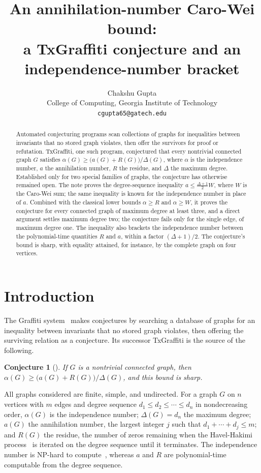 \documentclass[11pt]{article}
\title{An annihilation-number Caro-Wei bound:\\
       a TxGraffiti conjecture and an independence-number bracket}
\author{Chakshu Gupta\\[2pt]
  {\small College of Computing, Georgia Institute of Technology}\\
  {\small \texttt{cgupta65@gatech.edu}}}
\date{}
\newtheorem{conjecture}{Conjecture}
\theoremstyle{remark}
\newcommand{\degseq}{d_1 \le d_2 \le \cdots \le d_n}
\begin{document}
\maketitle

\begin{abstract}
Automated conjecturing programs scan collections of graphs for inequalities
between invariants that no stored graph violates, then offer the survivors for
proof or refutation. TxGraffiti, one such program, conjectured that every
nontrivial connected graph $G$ satisfies
$\alpha(G) \ge \bigl(a(G) + R(G)\bigr)/\Delta(G)$, where $\alpha$ is the
independence number, $a$ the annihilation number, $R$ the residue, and
$\Delta$ the maximum degree. Established only for two special families of
graphs, the conjecture has otherwise remained open. The note proves the
degree-sequence inequality $a \le \tfrac{\Delta+1}{2}W$, where $W$ is the
Caro-Wei sum; the same inequality is known for the independence number in
place of $a$. Combined with the classical lower bounds $\alpha \ge R$ and
$\alpha \ge W$, it proves the conjecture for every connected graph of maximum
degree at least three, and a direct argument settles maximum degree two; the
conjecture fails only for the single edge, of maximum degree one. The
inequality also brackets the independence number between the polynomial-time
quantities $R$ and $a$, within a factor $(\Delta+1)/2$. The
conjecture's bound is sharp, with equality attained, for instance, by the
complete graph on four vertices.
\end{abstract}

\section{Introduction}\label{sec:intro}

The Graffiti system~\cite{Fajtlowicz1988graffiti} makes conjectures by searching
a database of graphs for an inequality between invariants that no stored graph
violates, then offering the surviving relation as a conjecture. Its successor
TxGraffiti is the source of the following.

\begin{conjecture}[\cite{Davila2025reverie}]\label{conj:c1}
If $G$ is a nontrivial connected graph, then
$\alpha(G) \ge \bigl(a(G) + R(G)\bigr)/\Delta(G)$, and this bound is sharp.
\end{conjecture}

All graphs considered are finite, simple, and undirected. For a graph $G$ on $n$
vertices with $m$ edges and degree sequence $\degseq$ in nondecreasing order,
$\alpha(G)$ is the independence number; $\Delta(G) = d_n$ the maximum degree;
$a(G)$ the annihilation number, the largest integer $j$ such that
$d_1 + \cdots + d_j \le m$; and $R(G)$ the residue, the number of zeros
remaining when the Havel-Hakimi process~\cite{Havel1955, Hakimi1962} is iterated on the degree sequence until
it terminates. The independence number is NP-hard to compute~\cite{Karp1972},
whereas $a$ and $R$ are polynomial-time computable from the degree sequence.
\end{document}
